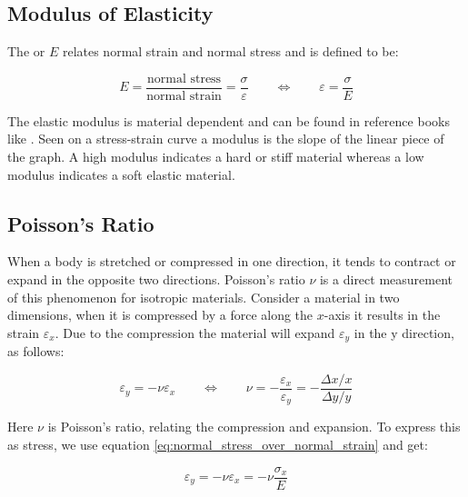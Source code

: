 \subsection{Modulus of Elasticity}
The  or  $E$ relates normal
strain and normal stress and is defined to be:

\begin{equation}
\label{eq:normal_stress_over_normal_strain}
  E =  \frac{\mbox{normal stress}}{\mbox{normal strain}}
  = \frac{\sigma}{\varepsilon}
  \qquad \Leftrightarrow \qquad
  \varepsilon = \frac{\sigma}{E}
\end{equation}

The elastic modulus is
material dependent and can be found in reference books like
. Seen on a stress-strain curve a 
modulus is the slope of the linear piece of the graph. A high modulus 
indicates a hard or stiff material whereas a low modulus indicates a
soft elastic material.

\subsection{Poisson's Ratio}
\label{sec:poissons_ratio}
When a body is stretched or compressed in one direction, it tends to
contract or expand in the opposite two directions. Poisson's ratio
$\nu$ is a direct measurement of this phenomenon for isotropic
materials. Consider a material in two dimensions, when it is
compressed by a force along the $x$-axis it results in the strain
$\varepsilon_x$. Due to the compression the material will expand 
$\varepsilon_y$ in the y direction, as follows:

\begin{equation}
  \varepsilon_y = - \nu \varepsilon_x
    \qquad \Leftrightarrow \qquad
    \nu =
    -\frac{\varepsilon_x}{\varepsilon_y} =
    -\frac{\Delta x / x}{\Delta y / y}
\end{equation}

Here $\nu$ is Poisson's ratio, relating the compression and
expansion. To express this as stress, we use equation
\eqref{eq:normal_stress_over_normal_strain} and get:

\begin{equation}
  \varepsilon_y = - \nu \varepsilon_x = - \nu \frac{\sigma_x}{E}
\end{equation}

